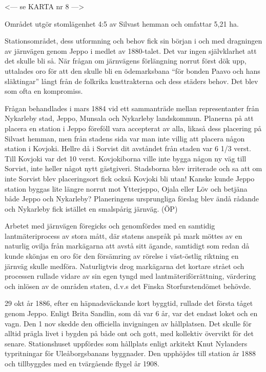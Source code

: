 
<--- se KARTA nr 8 --->




Området utgör stomlägenhet 4:5 av Silvast hemman och omfattar 5,21 ha.

\jhnooccupant{}


Stationsområdet, dess utformning och behov fick sin början i och med dragningen av järnvägen genom Jeppo i medlet av 1880-talet. Det var ingen självklarhet att det skulle bli så. När frågan om järnvägens förlängning norrut först dök upp, uttalades oro för att den skulle bli en ödemarksbana ``för bonden Paavo och hans släktingar'' långt från de folkrika kusttrakterna och dess städers behov. Det blev som ofta en kompromiss.

Frågan behandlades i mars 1884 vid ett sammanträde mellan representanter från Nykarleby stad, Jeppo, Munsala och Nykarleby landskommun. Planerna på att placera en station i Jeppo föreföll vara accepterat av alla, likaså dess placering på Silvast hemman, men från stadens sida var man inte villig att placera någon station i Kovjoki. Hellre då i Sorvist dit avståndet från staden var 6 1/3 verst. Till Kovjoki var det 10 verst. Kovjokiborna ville inte bygga någon ny väg till Sorvist, inte heller något nytt gästgiveri. Stadsborna blev irriterade och sa att om inte Sorvist blev placeringsort fick också Kovjoki bli utan! Kanske kunde Jeppo station byggas lite längre norrut mot Ytterjeppo, Ojala eller Löv och betjäna både Jeppo och Nykarleby? Planeringens ursprungliga förslag blev ändå rådande och Nykarleby fick istället en smalspårig järnväg. (ÖP)


Arbetet med järnvägen föregicks och genomfördes med en samtidig lantmäteriprocess av stora mått, där statens anspråk på mark möttes av en naturlig ovilja från markägarna att avstå sitt ägande, samtidigt som redan då kunde skönjas en oro för den försämring av rörelse i väst-östlig riktning en järnväg skulle medföra. Naturligtvis drog markägarna det kortare strået och processen rullade vidare av sin egen tyngd med lantmäteriförrättning, värdering och inlösen av de områden staten, d.v.s det Finska Storfurstendömet behövde.

29 okt år 1886, efter en häpnadsväckande kort byggtid, rullade det första tåget genom Jeppo. Enligt Brita Sandlin, som då var 6 år, var det endast loket och en vagn. Den 1 nov skedde den officiella invigningen av hållplatsen. Det skulle för alltid prägla livet i bygden på både ont och gott, med kollektiv övervikt för det senare. Stationshuset uppfördes som hållplats enligt arkitekt Knut Nylanders typritningar för Uleåborgsbanans byggnader. Den upphöjdes till station år 1888 och tillbyggdes med en tvärgående flygel år 1908.

